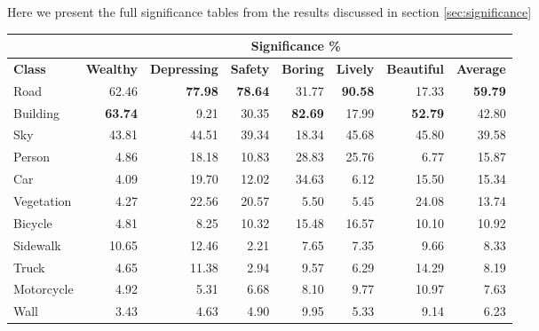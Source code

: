 Here we present the full significance tables from the results discussed in section \ref{sec:significance}

\begin{table}[H]
	\begin{tabular}{|l|rrrrrrr|}
		\hline
					& \multicolumn{7}{c|}{\textbf{Significance \%}}   \\ \hline
		\textbf{Class}         & \textbf{Wealthy}        & \textbf{Depressing}     & \textbf{Safety}         & \textbf{Boring}         & \textbf{Lively}         & \textbf{Beautiful}      & \textbf{Average}        \\
		\hline
		Road          & 62.46          & \textbf{77.98} & \textbf{78.64} & 31.77          & \textbf{90.58} & 17.33        & \textbf{59.79} \\
		Building      & \textbf{63.74} & 9.21           & 30.35          & \textbf{82.69} & 17.99          & \textbf{52.79} & 42.80          \\
		Sky           & 43.81          & 44.51          & 39.34          & 18.34          & 45.68          & 45.80          & 39.58          \\
		Person        & 4.86           & 18.18          & 10.83          & 28.83          & 25.76          & 6.77           & 15.87          \\
		Car           & 4.09           & 19.70          & 12.02          & 34.63          & 6.12           & 15.50          & 15.34          \\
		Vegetation    & 4.27           & 22.56          & 20.57          & 5.50           & 5.45           & 24.08          & 13.74          \\
		Bicycle       & 4.81           & 8.25           & 10.32          & 15.48          & 16.57          & 10.10          & 10.92          \\
		Sidewalk      & 10.65          & 12.46          & 2.21           & 7.65           & 7.35           & 9.66           & 8.33           \\
		Truck         & 4.65           & 11.38          & 2.94           & 9.57           & 6.29           & 14.29          & 8.19           \\
		Motorcycle    & 4.92           & 5.31           & 6.68           & 8.10           & 9.77           & 10.97          & 7.63           \\
		Wall          & 3.43           & 4.63           & 4.90           & 9.95           & 5.33           & 9.14           & 6.23           \\

\end{tabular}
\end{table}
